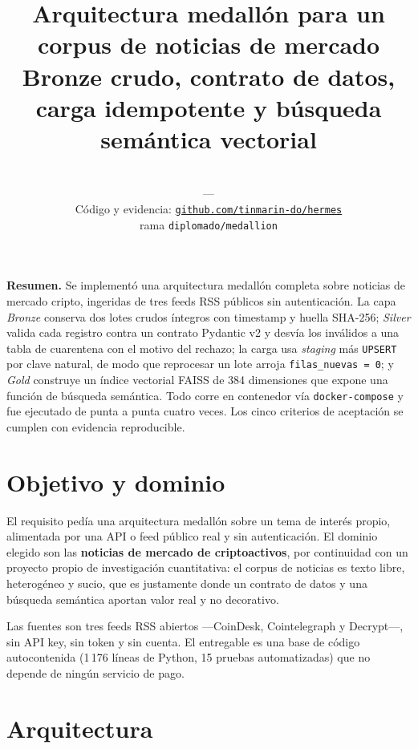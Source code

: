 \documentclass[11pt,a4paper]{article}
\title{\vspace{-1.5cm}\textbf{Arquitectura medallón para un corpus de noticias
de mercado}\\[0.3em]\large Bronze crudo, contrato de datos, carga idempotente
y búsqueda semántica vectorial}
\author{\Autora \\ \small \Materia\ ---\ \Institucion \\[0.5em]
  \small Código y evidencia: \href{\Repo}{\texttt{github.com/\allowbreak tinmarin-do/\allowbreak hermes}} \\
  \footnotesize rama \texttt{diplomado/medallion}}
\date{\Fecha}
\begin{document}
\maketitle

\begin{caja}
\textbf{Resumen.} Se implementó una arquitectura medallón completa sobre
noticias de mercado cripto, ingeridas de tres feeds RSS públicos sin
autenticación. La capa \emph{Bronze} conserva dos lotes crudos íntegros con
timestamp y huella SHA-256; \emph{Silver} valida cada registro contra un
contrato Pydantic v2 y desvía los inválidos a una tabla de cuarentena con el
motivo del rechazo; la carga usa \emph{staging} más \texttt{UPSERT} por clave
natural, de modo que reprocesar un lote arroja \texttt{filas\_nuevas = 0}; y
\emph{Gold} construye un índice vectorial FAISS de 384 dimensiones que expone
una función de búsqueda semántica. Todo corre en contenedor vía
\texttt{docker-compose} y fue ejecutado de punta a punta cuatro veces. Los cinco
criterios de aceptación se cumplen con evidencia reproducible.
\end{caja}

\section{Objetivo y dominio}

El requisito pedía una arquitectura medallón sobre un tema de interés propio,
alimentada por una API o feed público real y sin autenticación. El dominio
elegido son las \textbf{noticias de mercado de criptoactivos}, por continuidad
con un proyecto propio de investigación cuantitativa: el corpus de noticias es
texto libre, heterogéneo y sucio, que es justamente donde un contrato de datos y
una búsqueda semántica aportan valor real y no decorativo.

Las fuentes son tres feeds RSS abiertos ---CoinDesk, Cointelegraph y
Decrypt---, sin API key, sin token y sin cuenta. El entregable es una base de
código autocontenida (1\,176 líneas de Python, 15 pruebas automatizadas) que no
depende de ningún servicio de pago.

\section{Arquitectura}
\end{document}
